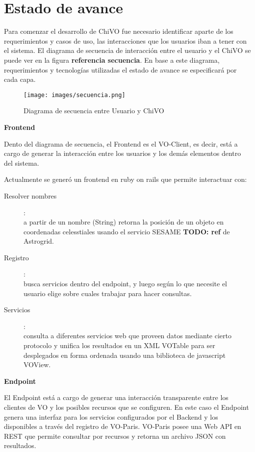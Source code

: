 \section{Estado de avance}

Para comenzar el desarrollo de ChiVO fue necesario identificar aparte de los 
requerimientos y casos de uso, las interacciones que los usuarios iban a tener 
con el sistema. El diagrama de secuencia de interacción entre el usuario y el 
ChiVO se puede ver en la figura \textbf{referencia secuencia}. 
En base a este diagrama, requerimientos y tecnologías utilizadas el estado de 
avance se especificará por cada capa.

\begin{figure}[h]
    \centering
    \texttt{[image: images/secuencia.png]}
    \caption{Diagrama de secuencia entre Usuario y ChiVO}
    \label{fig:secuencia}
\end{figure}

\textbf{Frontend}

Dento del diagrama de secuencia, el Frontend es el VO-Client, es decir, está a cargo de generar la interacción entre los usuarios y los demás elementos dentro del sistema.

Actualmente se generó un frontend en ruby on rails que permite interactuar con: 
\begin{description}
 \item[Resolver nombres]:\hfill \\
  a partir de un nombre (String) retorna la posición de un objeto en coordenadas celesstiales usando el servicio SESAME \textbf{TODO: ref} de Astrogrid.
 \item[Registro]: \hfill \\
 busca servicios dentro del endpoint, y luego según lo que necesite el usuario elige sobre cuales trabajar para hacer consultas. 
 \item[Servicios]: \hfill \\
 consulta a diferentes servicios web que proveen datos mediante cierto protocolo y unifica los resultados en un XML VOTable para ser desplegados en forma ordenada usando una biblioteca de javascript VOView.
\end{description}

\textbf{Endpoint}

El Endpoint está a cargo de generar una interacción transparente entre los clientes de VO y los posibles recursos que se configuren. En este caso el Endpoint genera una interfaz para los servicios configurados por el Backend y los disponibles a través del registro de VO-Paris. VO-Paris posee una Web API en REST que permite consultar por recursos y retorna un archivo JSON con resultados.

